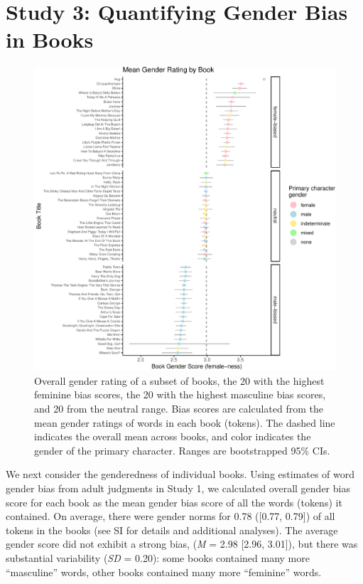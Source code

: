 \documentclass[english,,man,floatsintext]{apa6}
\begin{document}
\hypertarget{study-3-quantifying-gender-bias-in-books}{%
\section{Study 3: Quantifying Gender Bias in Books}\label{study-3-quantifying-gender-bias-in-books}}

\begin{figure}[b]
\includegraphics{kidbookgender_files/figure-latex/bookforest-1} \caption{Overall gender rating of  a subset of books, the 20 with the highest feminine bias scores, the 20 with the highest masculine bias scores, and 20 from the neutral range. Bias scores are calculated from the mean gender ratings of words in each book (tokens). The dashed line indicates the overall mean across books, and color indicates the gender of the primary character. Ranges are bootstrapped 95\% CIs.}\label{fig:bookforest}
\end{figure}

We next consider the genderedness of individual books. Using estimates of word gender bias from adult judgments in Study 1, we calculated overall gender bias score for each book as the mean gender bias score of all the words (tokens) it contained. On average, there were gender norms for 0.78 ({[}0.77, 0.79{]}) of all tokens in the books (see SI for details and additional analyses). The average gender score did not exhibit a strong bias, (\emph{M} = 2.98 {[}2.96, 3.01{]}), but there was substantial variability (\emph{SD} = 0.20): some books contained many more \enquote{masculine} words, other books contained many more \enquote{feminine} words.
\end{document}
